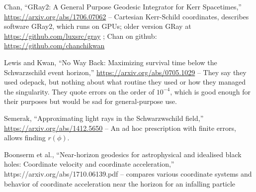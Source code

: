 \documentclass{article}
\begin{document}
Chan, ``GRay2: A General Purpose Geodesic Integrator for Kerr Spacetimes,''
\url{https://arxiv.org/abs/1706.07062} --
Cartesian Kerr-Schild coordinates, describes software GRay2, which runs on GPUs;
older version GRay at \url{https://github.com/luxsrc/gray} ; Chan on github:
\url{https://github.com/chanchikwan}

Lewis and Kwan, ``No Way Back: Maximizing survival time below the Schwarzschild event horizon,''
\url{https://arxiv.org/abs/0705.1029} -- They say they used odepack, but nothing about what
routine they used or how they managed the singularity. They quote errors on the order of
$10^{-4}$, which is good enough for their purposes but would be sad for general-purpose use.

Semerak, ``Approximating light rays in the Schwarzwschild field,''
\url{https://arxiv.org/abs/1412.5650} -- An ad hoc prescription with finite errors,
allows finding $r(\phi)$.

Boonserm et al., ``Near-horizon geodesics for astrophysical and idealised
black holes: Coordinate velocity and coordinate acceleration,''
https://arxiv.org/abs/1710.06139.pdf -- compares various coordinate systems
and behavior of coordinate acceleration near the horizon for an infalling particle
\end{document}

